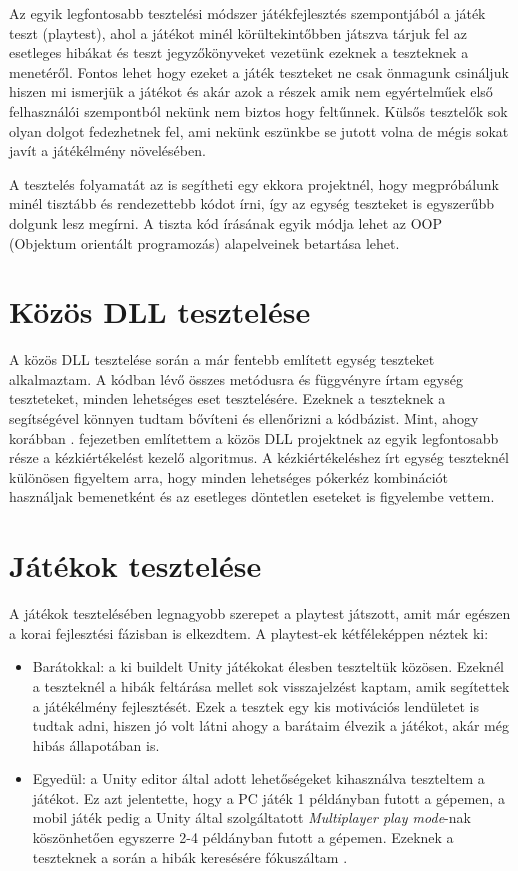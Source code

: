 \documentclass[]{thesis-ekf}
\theoremstyle{definition}
\theoremstyle{remark}
\begin{document}
Az egyik legfontosabb tesztelési módszer játékfejlesztés szempontjából a játék teszt (playtest), ahol a játékot minél körültekintőbben játszva tárjuk fel az esetleges hibákat és teszt jegyzőkönyveket vezetünk ezeknek a teszteknek a menetéről. Fontos lehet hogy ezeket a játék teszteket ne csak önmagunk csináljuk hiszen mi ismerjük a játékot és akár azok a részek amik nem egyértelműek első felhasználói szempontból nekünk nem biztos hogy feltűnnek. Külsős tesztelők sok olyan dolgot fedezhetnek fel, ami nekünk eszünkbe se jutott volna de mégis sokat javít a játékélmény növelésében.

A tesztelés folyamatát az is segítheti egy ekkora projektnél, hogy megpróbálunk minél tisztább és rendezettebb kódot írni, így az egység teszteket is egyszerűbb dolgunk lesz megírni. A tiszta kód írásának egyik módja lehet az OOP (Objektum orientált programozás) alapelveinek betartása lehet.

\section{Közös DLL tesztelése}

A közös DLL tesztelése során a már fentebb említett egység teszteket alkalmaztam. A kódban lévő összes metódusra és függvényre írtam egység teszteteket, minden lehetséges eset tesztelésére. Ezeknek a teszteknek a segítségével könnyen tudtam bővíteni és ellenőrizni a kódbázist. Mint, ahogy korábban . fejezetben említettem a közös DLL projektnek az egyik legfontosabb része a kézkiértékelést kezelő algoritmus. A kézkiértékeléshez írt egység teszteknél különösen figyeltem arra, hogy minden lehetséges pókerkéz kombinációt használjak bemenetként és az esetleges döntetlen eseteket is figyelembe vettem.

\section{Játékok tesztelése}

A játékok tesztelésében legnagyobb szerepet a playtest játszott, amit már egészen a korai fejlesztési fázisban is elkezdtem. A playtest-ek kétféleképpen néztek ki:

\begin{itemize}
	\item Barátokkal: a ki buildelt Unity játékokat élesben teszteltük közösen. Ezeknél a teszteknél a hibák feltárása mellet sok visszajelzést kaptam, amik segítettek a játékélmény fejlesztését. Ezek a tesztek egy kis motivációs lendületet is tudtak adni, hiszen jó volt látni ahogy a barátaim élvezik a játékot, akár még hibás állapotában is.
	\item Egyedül: a Unity editor által adott lehetőségeket kihasználva teszteltem a játékot. Ez azt jelentette, hogy a PC játék 1 példányban futott a gépemen, a mobil játék pedig a Unity által szolgáltatott \emph{Multiplayer play mode}-nak köszönhetően egyszerre 2-4 példányban futott a gépemen. Ezeknek a teszteknek a során a hibák keresésére fókuszáltam \cite{UnityMultiplayerPlayMode}.
\end{itemize}
\end{document}
